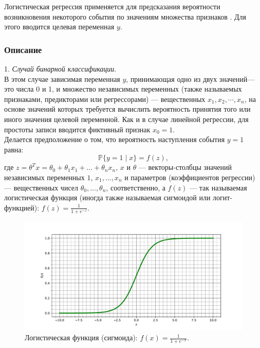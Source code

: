 Логистическая регрессия применяется для предсказания вероятности возникновения
некоторого события по значениям множества признаков \cite{ML_lectures}. Для этого вводится
целевая переменная ${\displaystyle y}$.

\subsubsection{Описание}
1. \textit{Случай бинарной классификации}.\\[0.3 cm]
В этом случае зависимая переменная $y$, принимающая одно из двух значений---это
числа 0  и 1, и множество
независимых переменных (также называемых признаками, предикторами или регрессорами) ---
вещественных $x_{1},x_{2},\cdots,x_{n}$, на основе значений которых требуется вычислить
вероятность принятия того или иного значения целевой переменной. Как и в случае
линейной регрессии, для простоты записи вводится фиктивный признак $x_0 = 1$.\\
Делается предположение о том, что вероятность наступления события $y = 1$ равна:
\begin{equation*}
    {\mathbb {P}}\{y=1\mid x\}=f(z),
\end{equation*}
где $z=\theta ^{T}x=\theta _{0}+\theta _{1}x_{1}+\ldots +\theta_{n}x_{n}$, $x$ и $\theta$
--- векторы-столбцы значений независимых переменных $1$, $x_{1},\dots ,x_{n}$ и параметров
(коэффициентов регрессии) — вещественных чисел $\theta _{0},...,\theta _{n}$,
соответственно, а $f(z)$ --- так называемая логистическая функция (иногда также
называемая сигмоидой или логит-функцией): $f(z)={\frac {1}{1+e^{{-z}}}}$.

\begin{figure}[H]
    \centering
    \includegraphics[width=0.99\linewidth]{images/sigmoid.pdf}
    \caption{Логистическая функция (сигмоида): $f(x)={\frac {1}{1+e^{{-x}}}}$.}
    \label{fig_7}
\end{figure}

